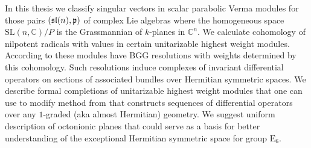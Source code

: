 \documentclass[12pt,a4paper,final]{report}
\begin{document}



\hypersetup{unicode}
\hypersetup{breaklinks=true}

\thispagestyle{empty}


In this thesis we classify singular vectors in scalar parabolic Verma modules for those pairs $(\mathfrak{sl}(n), \mathfrak{p})$  of complex Lie algebras where the homogeneous space $\mathrm{SL}(n, \mathbb{C}) / P$ is the Grassmannian of $k$-planes in $\mathbb{C}^n.$ We calculate cohomology of nilpotent radicals with values in certain unitarizable highest weight modules. According to \cite{boe_kostant_2009} these modules have  BGG resolutions with weights determined by this cohomology. Such resolutions induce complexes of invariant differential operators on sections of associated bundles over Hermitian symmetric spaces. We describe formal completions of unitarizable highest weight modules that one can use to modify method from \cite{calderbank_differential_2001} that constructs sequences of differential operators over any $1$-graded (aka almost Hermitian) geometry. We suggest uniform description of octonionic planes that could serve as a basis for better understanding of the exceptional Hermitian symmetric space for group $\mathrm{E}_6.$
\end{document}
